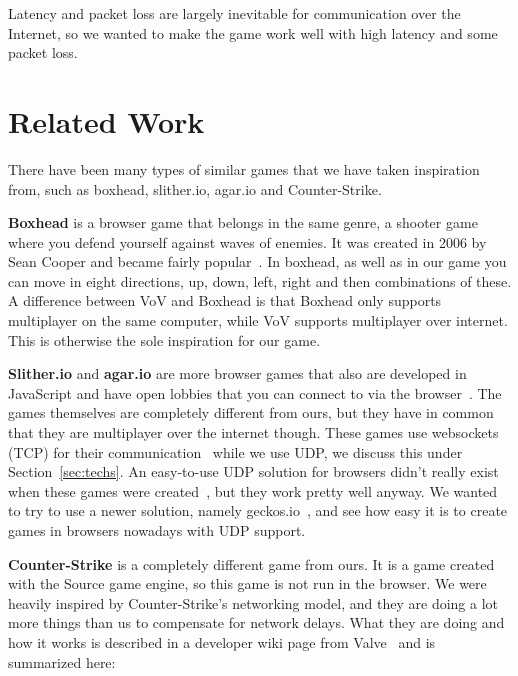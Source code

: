 \documentclass[a4paper]{article}
\begin{document}
Latency and packet loss are largely inevitable for communication over the Internet, so we wanted to make the game work well with high latency and some packet loss.

\section{Related Work}
There have been many types of similar games that we have taken inspiration from, such as boxhead, slither.io, agar.io and Counter-Strike.

\textbf{Boxhead} is a browser game that belongs in the same genre, a shooter game where you defend yourself against waves of enemies. It was created in 2006 by Sean Cooper and became fairly popular~\cite{boxhead}. In boxhead, as well as in our game you can move in eight directions, up, down, left, right and then combinations of these. A difference between VoV and Boxhead is that Boxhead only supports multiplayer on the same computer, while VoV supports multiplayer over internet. This is otherwise the sole inspiration for our game.

\textbf{Slither.io} and \textbf{agar.io} are more browser games that also are developed in JavaScript and have open lobbies that you can connect to via the browser~\cite{article:agar}. The games themselves are completely different from ours, but they have in common that they are multiplayer over the internet though. These games use websockets (TCP) for their communication~\cite{article:slither} while we use UDP, we discuss this under Section~\ref{sec:techs}. An easy-to-use UDP solution for browsers didn't really exist when these games were created~\cite{web:agario:webrtc}, but they work pretty well anyway. We wanted to try to use a newer solution, namely geckos.io~\cite{geckos}, and see how easy it is to create games in browsers nowadays with UDP support.

\textbf{Counter-Strike} is a completely different game from ours. It is a game created with the Source game engine, so this game is not run in the browser. We were heavily inspired by Counter-Strike's networking model, and they are doing a lot more things than us to compensate for network delays. What they are doing and how it works is described in a developer wiki page from Valve~\cite{web:valve:mp} and is summarized here:
\end{document}
